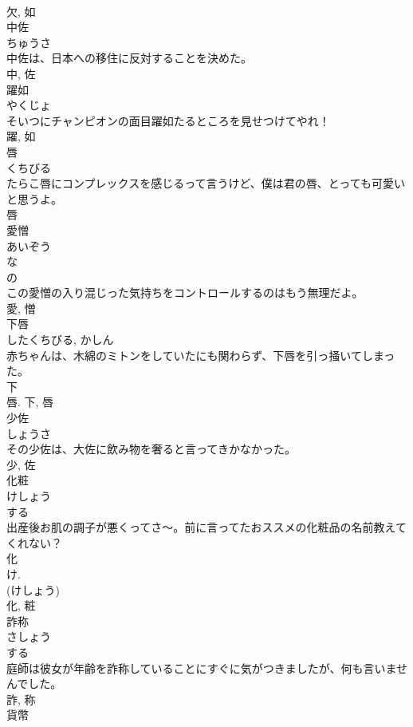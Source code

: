 \documentclass[8pt]{extreport}
\begin{document}
\begin{CJK}{UTF8}{min}
\\	欠, 如	
\\	中佐	
\\	ちゅうさ	
\\	中佐は、日本への移住に反対することを決めた。	
\\	中, 佐	
\\	躍如	
\\	やくじょ	
\\	そいつにチャンピオンの面目躍如たるところを見せつけてやれ！	
\\	躍, 如	
\\	唇	
\\	くちびる	
\\	たらこ唇にコンプレックスを感じるって言うけど、僕は君の唇、とっても可愛いと思うよ。	
\\	唇	
\\	愛憎	
\\	あいぞう	
\\	な 
\\	の 
\\	この愛憎の入り混じった気持ちをコントロールするのはもう無理だよ。	
\\	愛, 憎	
\\	下唇	
\\	したくちびる, かしん	
\\	赤ちゃんは、木綿のミトンをしていたにも関わらず、下唇を引っ掻いてしまった。	
\\	下 
\\	唇.	下, 唇	
\\	少佐	
\\	しょうさ	
\\	その少佐は、大佐に飲み物を奢ると言ってきかなかった。	
\\	少, 佐	
\\	化粧	
\\	けしょう	
\\	する 
\\	出産後お肌の調子が悪くってさ〜。前に言ってたおススメの化粧品の名前教えてくれない？	
\\	化 
\\	け. 
\\	(けしょう) 
\\	化, 粧	
\\	詐称	
\\	さしょう	
\\	する 
\\	庭師は彼女が年齢を詐称していることにすぐに気がつきましたが、何も言いませんでした。	
\\	詐, 称	
\\	貨幣	

\end{CJK}
\end{document}
